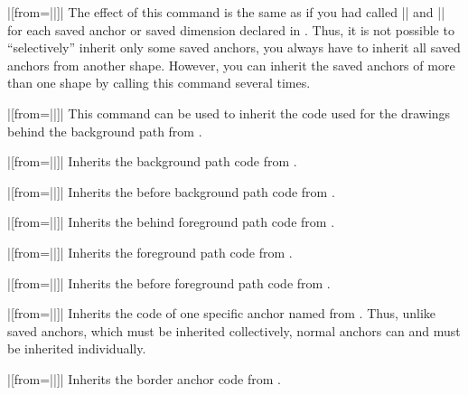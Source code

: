 \begin{command}{\pgfdeclareshape{}}
\begin{command}{\inheritsavedanchors|[from=||]|}
        The effect of this command is the same as if you had called
        |\savedanchor| and |\saveddimen| for each saved anchor or saved
        dimension declared in . Thus, it is not
        possible to ``selectively'' inherit only some saved anchors, you always
        have to inherit all saved anchors from another shape. However, you can
        inherit the saved anchors of more than one shape by calling this
        command several times.
    \end{command}
    \begin{command}{\inheritbehindbackgroundpath|[from=||]|}
        This command can be used to inherit the code used for the drawings
        behind the background path from .
    \end{command}
    \begin{command}{\inheritbackgroundpath|[from=||]|}
        Inherits the background path code from .
    \end{command}
    \begin{command}{\inheritbeforebackgroundpath|[from=||]|}
        Inherits the before background path code from .
    \end{command}
    \begin{command}{\inheritbehindforegroundpath|[from=||]|}
        Inherits the behind foreground path code from .
    \end{command}
    \begin{command}{\inheritforegroundpath|[from=||]|}
        Inherits the foreground path code from .
    \end{command}
    \begin{command}{\inheritbeforeforegroundpath|[from=||]|}
        Inherits the before foreground path code from .
    \end{command}
    \begin{command}{\inheritanchor|[from=||]|}
        Inherits the code of one specific anchor named  from
        . Thus, unlike saved anchors, which must be
        inherited collectively, normal anchors can and must be inherited
        individually.
    \end{command}
    \begin{command}{\inheritanchorborder|[from=||]|}
        Inherits the border anchor code from .
    \end{command}


\end{command}
